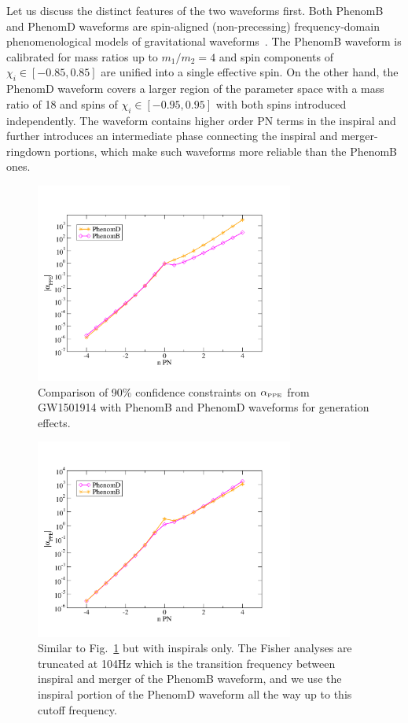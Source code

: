 \documentclass[prd,twocolumn,nofootinbib]{revtex4-1}
\newcommand{\PPE}{{\mbox{\tiny PPE}}}
\begin{document}
Let us discuss the distinct features of the two waveforms first. Both PhenomB and PhenomD waveforms are spin-aligned (non-precessing) frequency-domain phenomenological models of gravitational waveforms~\cite{Ajith:2009bn,Khan:2015jqa}. The PhenomB waveform is calibrated for mass ratios up to $m_1/m_2 = 4$ and spin components of $\chi_i\in[-0.85,0.85]$ are unified into a single effective spin. On the other hand, the PhenomD waveform covers a larger region of the parameter space with a mass ratio of 18 and spins of $\chi_i\in[-0.95,0.95]$ with both spins introduced independently. The waveform  contains higher order PN terms in the inspiral and further introduces an intermediate phase connecting the inspiral and merger-ringdown portions,
which make such waveforms more reliable than the PhenomB ones.

\begin{figure}[htb]
\includegraphics[width=8.5cm]{phenomBvsphenomD.pdf}
\caption{Comparison of 90\% confidence constraints on $\alpha_{\PPE}$ from GW1501914 with PhenomB and PhenomD waveforms for generation effects. }
\label{fig:phenomBvsD}
\end{figure}

\begin{figure}[htb]
\includegraphics[width=8.5cm]{phenomBvsphenomD-insp.pdf}
\caption{Similar to Fig.~\ref{fig:phenomBvsD} but with inspirals only. The Fisher analyses are truncated at 104Hz which is the transition frequency between inspiral and merger of the PhenomB waveform, and we use the inspiral portion of the PhenomD waveform all the way up to this cutoff frequency.}
\label{fig:phenomBvsD-insp}
\end{figure}
\end{document}
